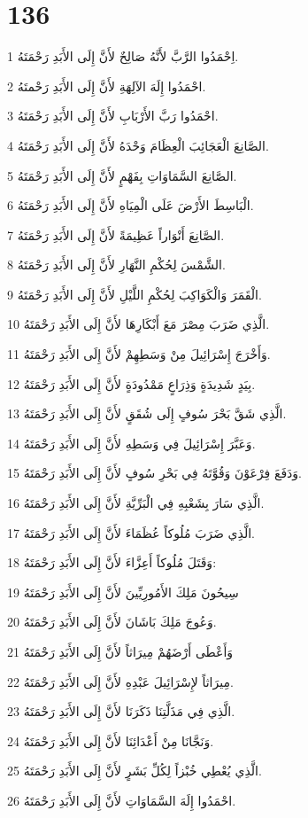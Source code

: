 \chapter{136}

\par 1 اِحْمَدُوا الرَّبَّ لأَنَّهُ صَالِحٌ لأَنَّ إِلَى الأَبَدِ رَحْمَتَهُ.
\par 2 احْمَدُوا إِلَهَ الآلِهَةِ لأَنَّ إِلَى الأَبَدِ رَحْمتَهُ.
\par 3 احْمَدُوا رَبَّ الأَرْبَابِ لأَنَّ إِلَى الأَبَدِ رَحْمَتَهُ.
\par 4 الصَّانِعَ الْعَجَائِبَ الْعِظَامَ وَحْدَهُ لأَنَّ إِلَى الأَبَدِ رَحْمَتَهُ.
\par 5 الصَّانِعَ السَّمَاوَاتِ بِفَهْمٍ لأَنَّ إِلَى الأَبَدِ رَحْمَتَهُ.
\par 6 الْبَاسِطَ الأَرْضَ عَلَى الْمِيَاهِ لأَنَّ إِلَى الأَبَدِ رَحْمَتَهُ.
\par 7 الصَّانِعَ أَنْوَاراً عَظِيمَةً لأَنَّ إِلَى الأَبَدِ رَحْمَتَهُ.
\par 8 الشَّمْسَ لِحُكْمِ النَّهَارِ لأَنَّ إِلَى الأَبَدِ رَحْمَتَهُ.
\par 9 الْقَمَرَ وَالْكَوَاكِبَ لِحُكْمِ اللَّيْلِ لأَنَّ إِلَى الأَبَدِ رَحْمَتَهُ.
\par 10 الَّذِي ضَرَبَ مِصْرَ مَعَ أَبْكَارِهَا لأَنَّ إِلَى الأَبَدِ رَحْمَتَهُ.
\par 11 وَأَخْرَجَ إِسْرَائِيلَ مِنْ وَسَطِهِمْ لأَنَّ إِلَى الأَبَدِ رَحْمَتَهُ.
\par 12 بِيَدٍ شَدِيدَةٍ وَذِرَاعٍ مَمْدُودَةٍ لأَنَّ إِلَى الأَبَدِ رَحْمَتَهُ.
\par 13 الَّذِي شَقَّ بَحْرَ سُوفٍ إِلَى شُقَقٍ لأَنَّ إِلَى الأَبَدِ رَحْمَتَهُ.
\par 14 وَعَبَّرَ إِسْرَائِيلَ فِي وَسَطِهِ لأَنَّ إِلَى الأَبَدِ رَحْمَتَهُ.
\par 15 وَدَفَعَ فِرْعَوْنَ وَقُوَّتَهُ فِي بَحْرِ سُوفٍ لأَنَّ إِلَى الأَبَدِ رَحْمَتَهُ.
\par 16 الَّذِي سَارَ بِشَعْبِهِ فِي الْبَرِّيَّةِ لأَنَّ إِلَى الأَبَدِ رَحْمَتَهُ.
\par 17 الَّذِي ضَرَبَ مُلُوكاً عُظَمَاءَ لأَنَّ إِلَى الأَبَدِ رَحْمَتَهُ.
\par 18 وَقَتَلَ مُلُوكاً أَعِزَّاءَ لأَنَّ إِلَى الأَبَدِ رَحْمَتَهُ:
\par 19 سِيحُونَ مَلِكَ الأَمُورِيِّينَ لأَنَّ إِلَى الأَبَدِ رَحْمَتَهُ
\par 20 وَعُوجَ مَلِكَ بَاشَانَ لأَنَّ إِلَى الأَبَدِ رَحْمَتَهُ.
\par 21 وَأَعْطَى أَرْضَهُمْ مِيرَاثاً لأَنَّ إِلَى الأَبَدِ رَحْمَتَهُ
\par 22 مِيرَاثاً لإِسْرَائِيلَ عَبْدِهِ لأَنَّ إِلَى الأَبَدِ رَحْمَتَهُ.
\par 23 الَّذِي فِي مَذَلَّتِنَا ذَكَرَنَا لأَنَّ إِلَى الأَبَدِ رَحْمَتَهُ.
\par 24 وَنَجَّانَا مِنْ أَعْدَائِنَا لأَنَّ إِلَى الأَبَدِ رَحْمَتَهُ.
\par 25 الَّذِي يُعْطِي خُبْزاً لِكُلِّ بَشَرٍ لأَنَّ إِلَى الأَبَدِ رَحْمَتَهُ.
\par 26 احْمَدُوا إِلَهَ السَّمَاوَاتِ لأَنَّ إِلَى الأَبَدِ رَحْمَتَهُ.

